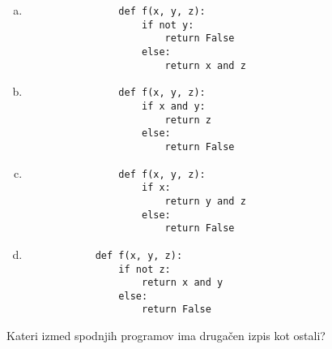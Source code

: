 \documentclass[arhiv, 10pt]{../izpit}
\begin{document}
        \begin{multicols}{2}
        \begin{enumerate}[(a)]
\item 
                \begin{verbatim}
                def f(x, y, z):
                    if not y:
                        return False
                    else:
                        return x and z
                \end{verbatim}
            
\item 
                \begin{verbatim}
                def f(x, y, z):
                    if x and y:
                        return z
                    else:
                        return False
                \end{verbatim}
            
\item 
                \begin{verbatim}
                def f(x, y, z):
                    if x:
                        return y and z
                    else:
                        return False
                \end{verbatim}
            
\item 
            \begin{verbatim}
            def f(x, y, z):
                if not z:
                    return x and y
                else:
                    return False
            \end{verbatim}
        
\end{enumerate}

        \end{multicols}
    
        \naloga*
        
        Kateri izmed spodnjih programov ima drugačen izpis kot ostali?
    
\end{document}

